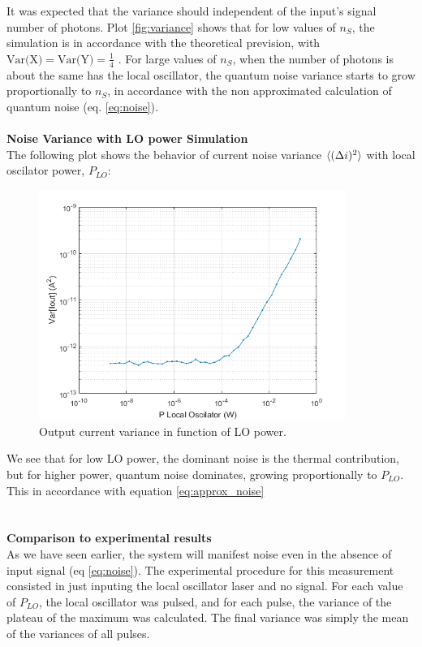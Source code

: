 %
It was expected that the variance should independent of the input's signal number of photons. Plot \ref{fig:variance} shows that for low values of $n_S$, the simulation is in accordance with the theoretical prevision, with $\textrm{Var(X)} = \textrm{Var(Y)} = \frac{1}{4}$ . For large values of $n_S$, when the number of photons is about the same has the local oscillator, the quantum noise variance starts to grow proportionally to $n_S$, in accordance with the non approximated calculation of quantum noise (eq. \ref{eq:noise}).\\
\\
{\bf Noise Variance with LO power Simulation}\\
The following plot shows the behavior of current noise variance $\braket{(\Delta i)^2}$ with local oscilator power, $P_{LO}$:
%
%
\begin{figure}[H]
\centering
\includegraphics[width=10cm]{./sdf/quantum_noise/figures/power_plot.png}
\caption{Output current variance in function of LO power.}
\label{fig:variance_lo_power}
\end{figure}
%
%
We see that for low LO power, the dominant noise is the thermal contribution, but for higher power, quantum noise dominates, growing proportionally to $P_{LO}$. This in accordance with equation \ref{eq:approx_noise}\\
\\
\\
{\bf Comparison to experimental results}\\
As we have seen earlier, the system will manifest noise even in the absence of input signal (eq \ref{eq:noise}). The experimental procedure for this measurement consisted in just inputing the local oscillator laser and no signal. For each value of  $P_{LO}$, the local oscillator was pulsed, and for each pulse, the variance of the plateau of the maximum was calculated. The final variance was simply the mean of the variances of all pulses.
